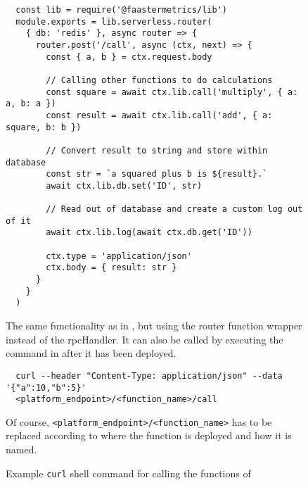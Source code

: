 \documentclass[../main.tex]{subfiles}
\begin{document}
\begin{figure}
\begin{tcolorbox}
\begin{verbatim}
  const lib = require('@faastermetrics/lib')
  module.exports = lib.serverless.router(
    { db: 'redis' }, async router => {
      router.post('/call', async (ctx, next) => {
        const { a, b } = ctx.request.body
    
        // Calling other functions to do calculations
        const square = await ctx.lib.call('multiply', { a: a, b: a })
        const result = await ctx.lib.call('add', { a: square, b: b })
   
        // Convert result to string and store within database
        const str = `a squared plus b is ${result}.`
        await ctx.lib.db.set('ID', str)
  
        // Read out of database and create a custom log out of it
        await ctx.lib.log(await ctx.db.get('ID'))
  
        ctx.type = 'application/json'
        ctx.body = { result: str }
      }
    }
  )
\end{verbatim}
\end{tcolorbox}
\caption{%
  The same functionality as in , 
  but using the router function wrapper instead of the rpcHandler.
  It can also be called by executing the command in  
  after it has been deployed.
}%
\label{fig:routerFullFunctionalityExample}
\end{figure}

\begin{figure}
  \begin{tcolorbox}[left=-2.0mm, top=3mm, bottom=3mm]
  \hfuzz=5pt
  \begin{verbatim}
  curl --header "Content-Type: application/json" --data '{"a":10,"b":5}' 
  <platform_endpoint>/<function_name>/call\end{verbatim}
  \end{tcolorbox}
  \caption{Example \texttt{curl} shell command for calling the functions of 
  }
  Of course, \texttt{<platform\_endpoint>/<function\_name>} has to be replaced according to 
  where the function is deployed and how it is named.\label{fig:curlExampleCall}
\end{figure}
\end{document}

